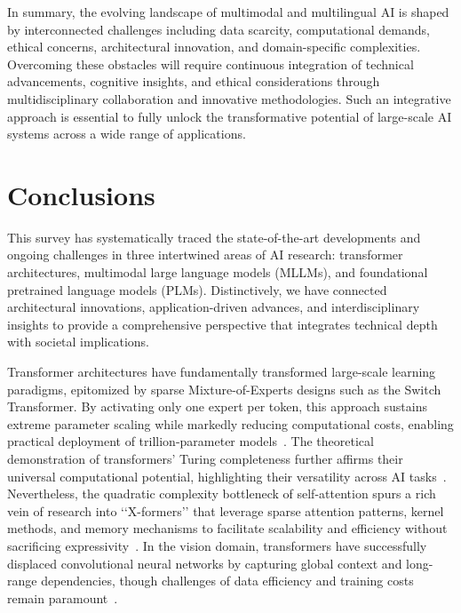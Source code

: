 \documentclass[sigconf]{acmart}
\begin{document}
\bigskip

In summary, the evolving landscape of multimodal and multilingual AI is shaped by interconnected challenges including data scarcity, computational demands, ethical concerns, architectural innovation, and domain-specific complexities. Overcoming these obstacles will require continuous integration of technical advancements, cognitive insights, and ethical considerations through multidisciplinary collaboration and innovative methodologies. Such an integrative approach is essential to fully unlock the transformative potential of large-scale AI systems across a wide range of applications.

\section{Conclusions}

This survey has systematically traced the state-of-the-art developments and ongoing challenges in three intertwined areas of AI research: transformer architectures, multimodal large language models (MLLMs), and foundational pretrained language models (PLMs). Distinctively, we have connected architectural innovations, application-driven advances, and interdisciplinary insights to provide a comprehensive perspective that integrates technical depth with societal implications.

Transformer architectures have fundamentally transformed large-scale learning paradigms, epitomized by sparse Mixture-of-Experts designs such as the Switch Transformer. By activating only one expert per token, this approach sustains extreme parameter scaling while markedly reducing computational costs, enabling practical deployment of trillion-parameter models~\cite{ref14}. The theoretical demonstration of transformers’ Turing completeness further affirms their universal computational potential, highlighting their versatility across AI tasks~\cite{ref15}. Nevertheless, the quadratic complexity bottleneck of self-attention spurs a rich vein of research into ‘‘X-formers’’ that leverage sparse attention patterns, kernel methods, and memory mechanisms to facilitate scalability and efficiency without sacrificing expressivity~\cite{ref21}. In the vision domain, transformers have successfully displaced convolutional neural networks by capturing global context and long-range dependencies, though challenges of data efficiency and training costs remain paramount~\cite{ref22}.
\end{document}
